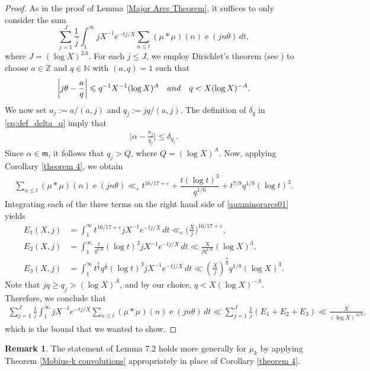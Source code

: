 \documentclass[11pt]{amsart}
\numberwithin{equation}{section}
\numberwithin{figure}{section}
\theoremstyle{definition}
\newtheorem{remark}{Remark}[section]
\newcommand{\e}{\operatorname{e}}
\begin{document}
\begin{proof}
As in the proof of Lemma \ref{Major Arcs Theorem}, it suffices to only consider the sum 
\[ \sum_{j=1}^J \frac{1}{j} \int_1^\infty jX^{-1}e^{-tj/X} \sum_{n \leqslant t}  (\mu * \mu)(n) \e(j n \theta) \, dt,
\]
where $J=(\log X)^{2A}$. For each $j \leqslant J$, we employ Dirichlet's theorem (see \cite[Lemma 2.1]{V1997}) to choose $a \in \mathbb{Z}$ and $q \in \mathbb{N}$ with $(a,q)=1$ such that 
\begin{align*}
\bigg| j \theta - \frac{a}{q} \bigg| \leqslant q^{-1} X^{-1} (\log X)^A \quad \textnormal{and} \quad q < X(\log X)^{-A}.
\end{align*}
We now set $a _j:= a/(a,j)$ and $q _j:=jq/(a,j)$.
The definition of $\delta_q$ in \eqref{eq:def_delta_q} imply that
\begin{align*}
\bigg|  \alpha - \frac{a _j}{q _j} \bigg| \leqslant \delta_{q _j}.
\end{align*}
Since $\alpha \in \mathfrak{m}$, it follows that $q _j > Q$, where $Q=(\log X)^A$. Now, applying Corollary \ref{theorem 4}, we obtain 
\begin{align} \label{auxminorarcs01}
\sum_{n \leqslant t}  (\mu * \mu)(n) \e(j n \theta) \ll_{\varepsilon} t^{16/17+\varepsilon}+\dfrac{t(\log t)^{3}}{q^{1/6}} + t^{7/8}q^{1/8}(\log t)^{3}.
\end{align}
Integrating each of the three terms on the right hand side of \eqref{auxminorarcs01} yields
\begin{align*}
E_1(X,j) &= \int_1^\infty t^{16/17+\varepsilon} j X^{-1} e^{-tj/X} \, dt \ll_{\varepsilon} \bigg(\frac{X}{j}\bigg)^{16/17+\varepsilon}, \\
E_2(X,j) &= \int_1^\infty \frac{t}{q^{1/6}} (\log t)^3 j X^{-1} e^{-tj/X} \, dt \ll \frac{X}{{j{q^{1/6}}}}\left( {\log X} \right)^3, \\
E_3(X,j) &= \int_1^\infty t^{\frac{7}{8}}q^{\frac{1}{8}} (\log t)^{3} j X^{-1} e^{-tj/X} \, dt \ll {\left( {\frac{X}{j}} \right)^{\frac{7}{8}}}{q^{1/8}}\left( {\log X} \right)^3.
\end{align*}
Note that $jq \geqslant q _j > (\log X)^{A}$, and by our choice, $ q < X(\log X)^{-A} $. Therefore, we conclude that
\begin{align*}
\sum_{j=1}^J \frac{1}{j} \int_1^\infty jX^{-1}e^{-tj/X} \sum_{n \leqslant t}  (\mu * \mu)(n) \e(j n \theta) \, dt \ll \sum_{j=1}^J \frac{1}{j} (E_1+E_2+E_3) \ll \frac{X}{(\log X)^{A/9}},
\end{align*}   
which is the bound that we wanted to show.
\end{proof}
\begin{remark}
The statement of Lemma 7.2 holds more generally for $\mu_k$ by applying Theorem \ref{Mobius-k convolutions} appropriately in place of Corollary \ref{theorem 4}.  
\end{remark}
\end{document}
